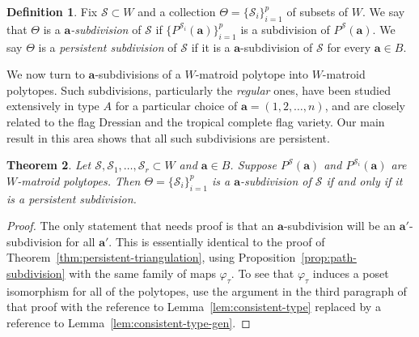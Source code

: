 \documentclass{amsart}
\newtheorem{thm}{Theorem}[section]
\theoremstyle{definition}
\newtheorem{defn}[thm]{Definition}
\def\ba{\mathbf{a}}
\def\cS{\mathcal{S}}
\begin{document}
\begin{defn}
    Fix $\cS \subset W$ and a collection $\Theta=\{\cS_i\}_{i=1}^p$ of subsets of $W$. We say that $\Theta$ is a \emph{$\ba$-subdivision} of $\cS$ if $\{P^{\cS_i}(\ba)\}_{i=1}^p$ is a subdivision of $P^\cS(\ba)$. We say $\Theta$ is a \emph{persistent subdivision} of  $\cS$ if it is a $\ba$-subdivision of $\cS$ for every $\ba\in B$.
\end{defn}

We now turn to $\ba$-subdivisions of a $W$-matroid polytope into $W$-matroid polytopes. Such subdivisions, particularly the \emph{regular} ones, have been studied extensively in type $A$ for a particular choice of $\ba = (1,2,\dots, n)$, and are closely related to the flag Dressian and the tropical complete flag variety. Our main result in this area shows that all such subdivisions are persistent.

\begin{thm}
    Let $\cS, \cS_1, \dots, \cS_r \subset W$ and $\ba \in B$. Suppose $P^{\cS}(\ba)$ and $P^{\cS_i}(\ba)$ are $W$-matroid polytopes. Then $\Theta=\{\cS_i\}_{i=1}^p$ is a $\ba$-subdivision of $\cS$ if and only if it is a persistent subdivision.
\end{thm}

\begin{proof}
    The only statement that needs proof is that an $\ba$-subdivision will be an $\ba'$-subdivision for all $\ba'$. This is essentially identical to the proof of Theorem~\ref{thm:persistent-triangulation}, using Proposition~\ref{prop:path-subdivision} with the same family of maps $\varphi_\tau$. To see that $\varphi_\tau$ induces a poset isomorphism for all of the polytopes, use the argument in the third paragraph of that proof with the reference to Lemma~\ref{lem:consistent-type} replaced by a reference to Lemma~\ref{lem:consistent-type-gen}.
\end{proof}

\printbibliography
\end{document}

